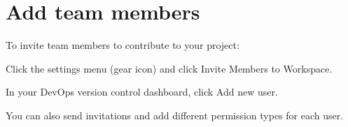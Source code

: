 \chapter{Add team members}
\hypertarget{md__hey_tea_9_2_library_2_package_cache_2com_8unity_8collab-proxy_0d2_80_85_2_documentation_0i_2_add_members}{}\label{md__hey_tea_9_2_library_2_package_cache_2com_8unity_8collab-proxy_0d2_80_85_2_documentation_0i_2_add_members}
\label{md__hey_tea_9_2_library_2_package_cache_2com_8unity_8collab-proxy_0d2_80_85_2_documentation_0i_2_add_members_autotoc_md864}%
%
 To invite team members to contribute to your project\+:


\begin{DoxyEnumerate}
\item Click the settings menu (gear icon) and click Invite Members to Workspace.
\end{DoxyEnumerate}




\begin{DoxyEnumerate}
\item In your Dev\+Ops version control dashboard, click Add new user.
\end{DoxyEnumerate}

You can also send invitations and add different permission types for each user. 